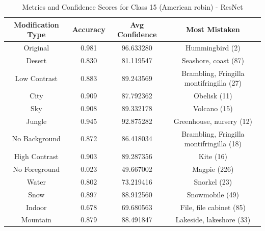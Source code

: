 \begin{table}
	\centering
	\begin{tabular}{|c|c|c|c|}
		\hline
		\textbf{Modification Type} & \textbf{Accuracy} & \textbf{Avg Confidence} & \textbf{Most Mistaken} \\
		\hline
		Original & 0.981 & 96.633280 & Hummingbird (2) \\
		\hline
		Desert & 0.830 & 81.119547 & Seashore, coast (87) \\
		\hline
		Low Contrast & 0.883 & 89.243569 & Brambling, Fringilla montifringilla (27) \\
		\hline
		City & 0.909 & 87.792362 & Obelisk (11) \\
		\hline
		Sky & 0.908 & 89.332178 & Volcano (15) \\
		\hline
		Jungle & 0.945 & 92.875282 & Greenhouse, nursery (12) \\
		\hline
		No Background & 0.872 & 86.418034 & Brambling, Fringilla montifringilla (18) \\
		\hline
		High Contrast & 0.903 & 89.287356 & Kite (16) \\
		\hline
		No Foreground & 0.023 & 49.667002 & Magpie (226) \\
		\hline
		Water & 0.802 & 73.219416 & Snorkel (23) \\
		\hline
		Snow & 0.897 & 88.912560 & Snowmobile (49) \\
		\hline
		Indoor & 0.678 & 69.680563 & File, file cabinet (85) \\
		\hline
		Mountain & 0.879 & 88.491847 & Lakeside, lakeshore (33) \\
		\hline
	\end{tabular}
	\caption{Metrics and Confidence Scores for Class 15 (American robin) - ResNet}
	\label{tab:metrics_confidence_class_15_resnet}
\end{table}

